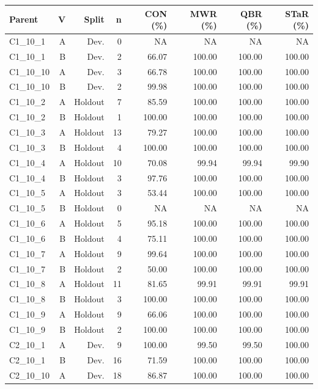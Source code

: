 \begingroup
\small
\setlength{\tabcolsep}{3pt}
\begin{longtable}{@{}lrrrrrrr@{}}
\toprule
Parent & V & Split & n & CON (\%) & MWR (\%) & QBR (\%) & STaR (\%) \\
\midrule
\endhead
C1\_10\_1 & A & Dev. & 0 & NA & NA & NA & NA \\
C1\_10\_1 & B & Dev. & 2 & 66.07 & 100.00 & 100.00 & 100.00 \\
C1\_10\_10 & A & Dev. & 3 & 66.78 & 100.00 & 100.00 & 100.00 \\
C1\_10\_10 & B & Dev. & 2 & 99.98 & 100.00 & 100.00 & 100.00 \\
C1\_10\_2 & A & Holdout & 7 & 85.59 & 100.00 & 100.00 & 100.00 \\
C1\_10\_2 & B & Holdout & 1 & 100.00 & 100.00 & 100.00 & 100.00 \\
C1\_10\_3 & A & Holdout & 13 & 79.27 & 100.00 & 100.00 & 100.00 \\
C1\_10\_3 & B & Holdout & 4 & 100.00 & 100.00 & 100.00 & 100.00 \\
C1\_10\_4 & A & Holdout & 10 & 70.08 & 99.94 & 99.94 & 99.90 \\
C1\_10\_4 & B & Holdout & 3 & 97.76 & 100.00 & 100.00 & 100.00 \\
C1\_10\_5 & A & Holdout & 3 & 53.44 & 100.00 & 100.00 & 100.00 \\
C1\_10\_5 & B & Holdout & 0 & NA & NA & NA & NA \\
C1\_10\_6 & A & Holdout & 5 & 95.18 & 100.00 & 100.00 & 100.00 \\
C1\_10\_6 & B & Holdout & 4 & 75.11 & 100.00 & 100.00 & 100.00 \\
C1\_10\_7 & A & Holdout & 9 & 99.64 & 100.00 & 100.00 & 100.00 \\
C1\_10\_7 & B & Holdout & 2 & 50.00 & 100.00 & 100.00 & 100.00 \\
C1\_10\_8 & A & Holdout & 11 & 81.65 & 99.91 & 99.91 & 99.91 \\
C1\_10\_8 & B & Holdout & 3 & 100.00 & 100.00 & 100.00 & 100.00 \\
C1\_10\_9 & A & Holdout & 9 & 66.06 & 100.00 & 100.00 & 100.00 \\
C1\_10\_9 & B & Holdout & 2 & 100.00 & 100.00 & 100.00 & 100.00 \\
C2\_10\_1 & A & Dev. & 9 & 100.00 & 99.50 & 99.50 & 100.00 \\
C2\_10\_1 & B & Dev. & 16 & 71.59 & 100.00 & 100.00 & 100.00 \\
C2\_10\_10 & A & Dev. & 18 & 86.87 & 100.00 & 100.00 & 100.00 \\

\end{longtable}
